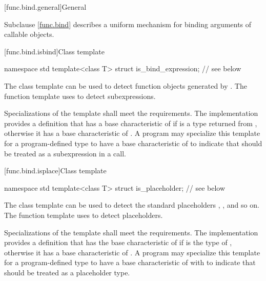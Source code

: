 [func.bind.general]{General}%

\pnum
Subclause \ref{func.bind} describes a uniform mechanism for binding
arguments of callable objects.

[func.bind.isbind]{Class template }

%
\begin{codeblock}
namespace std {
  template<class T> struct is_bind_expression;  // see below
}
\end{codeblock}

\pnum
The class template  can be used to detect function objects
generated by . The function template 
uses  to detect subexpressions.

\pnum
Specializations of the  template shall meet
the  requirements. The implementation
provides a definition that has a base characteristic of
 if  is a type returned from ,
otherwise it has a base characteristic of .
A program may specialize this template for a program-defined type 
to have a base characteristic of  to indicate that
 should be treated as a subexpression in a  call.

[func.bind.isplace]{Class template }

%
\begin{codeblock}
namespace std {
  template<class T> struct is_placeholder;      // see below
}
\end{codeblock}

\pnum
The class template  can be used to detect the standard placeholders
, , and so on. The function template  uses
 to detect placeholders.

\pnum
Specializations of the  template shall meet
the  requirements. The implementation
provides a definition that has the base characteristic of
 if  is the type of
, otherwise it has a
base characteristic of . A program
may specialize this template for a program-defined type  to
have a base characteristic of 
with  to indicate that  should be
treated as a placeholder type.

